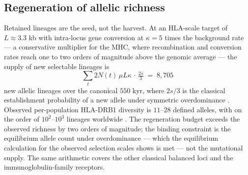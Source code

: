 \subsection{Regeneration of allelic richness}
Retained lineages are the seed, not the harvest. At an HLA-scale target of
$L \approx 3.3$ kb with intra-locus gene conversion at $\kappa = 5$ times
the background rate --- a conservative multiplier for the MHC, where
recombination and conversion rates reach one to two orders of magnitude
above the genomic average \citep{GarriganHedrick2003} --- the supply of new
selectable lineages is
\begin{equation}\label{eq:hlares}
\sum_t 2N(t)\,\mu L\kappa\,\cdot\,\tfrac{2s}{3}
\;=\; 8{,}705
\end{equation}
new allelic lineages over the canonical $550$ kyr, where $2s/3$ is the
classical establishment probability of a new allele under symmetric
overdominance \citep{Takahata1990,CrowKimura1970}. Observed per-population
HLA-DRB1 diversity is $11$--$28$ defined alleles, with on the order of
$10^2$--$10^3$ lineages worldwide \citep{vonSalome2007}. The regeneration
budget exceeds the observed richness
by two orders of magnitude; the binding constraint is the equilibrium
allele count under overdominance --- which the equilibrium calculation for
the observed selection scales shows is met --- not the mutational supply.
The same arithmetic covers the other
classical balanced loci and the immunoglobulin-family receptors.

